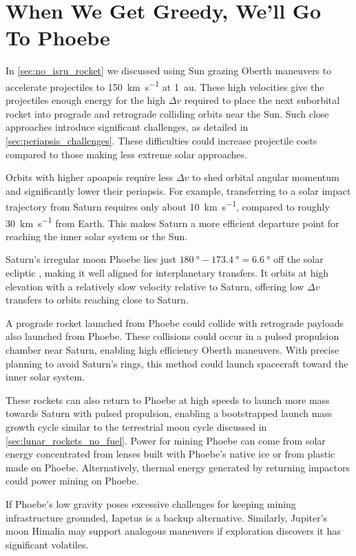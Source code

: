 \documentclass{article}
\begin{document}
\section{When We Get Greedy, We'll Go To Phoebe}\label{sec:greedy_phoebe}
In \autoref{sec:no_isru_rocket} we discussed using Sun grazing Oberth maneuvers to accelerate projectiles to \SI{150}{\kilo\meter\per\second} at \SI{1}{\astronomicalunit}. These high velocities give the projectiles enough energy for the high $\Delta v$ required to place the next suborbital rocket into  prograde and retrograde colliding orbits near the Sun. Such close approaches introduce significant challenges, as detailed in \autoref{sec:periapsis_challenges}. These difficulties could increase projectile costs compared to those making less extreme solar approaches.

Orbits with higher apoapsis require less $\Delta v$ to shed orbital angular momentum and significantly lower their periapsis. For example, transferring to a solar impact trajectory from Saturn requires only about \SI{10}{\kilo\meter\per\second}, compared to roughly \SI{30}{\kilo\meter\per\second} from Earth. This makes Saturn a more efficient departure point for reaching the inner solar system or the Sun.

Saturn’s irregular moon Phoebe lies just $\SI{180}{\degree} - \SI{173.4}{\degree} = \SI{6.6}{\degree}$ off the solar ecliptic \cite{phoebe}, making it well aligned for interplanetary transfers. It orbits at high elevation with a relatively slow velocity relative to Saturn, offering low $\Delta v$ transfers to orbits reaching close to Saturn.

A prograde rocket launched from Phoebe could collide with retrograde payloads also launched from Phoebe. These collisions could occur in a pulsed propulsion chamber near Saturn, enabling high efficiency Oberth maneuvers. With precise planning to avoid Saturn’s rings, this method could launch spacecraft toward the inner solar system.

These rockets can also return to Phoebe at high speeds to launch more mass towards Saturn with pulsed propulsion, enabling a bootstrapped launch mass growth cycle similar to the terrestrial moon  cycle discussed in \autoref{sec:lunar_rockets_no_fuel}. Power for mining Phoebe can come from solar energy concentrated from lenses built with Phoebe’s native ice or from plastic made on Phoebe.  Alternatively, thermal energy generated by returning impactors could power mining on Phoebe.

If Phoebe’s low gravity poses excessive challenges for keeping mining infrastructure grounded, Iapetus is a backup alternative. Similarly, Jupiter’s moon Himalia may support analogous maneuvers if exploration discovers  it has significant volatiles.  
\end{document}
